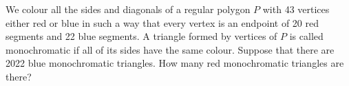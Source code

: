 \documentclass{article}
\begin{document}
\setlength{\parindent}{0pt}
We colour all the sides and diagonals of a regular polygon $P$ with 43 vertices either red or blue in such a way that every vertex is an endpoint of 20 red segments and 22 blue segments. A triangle formed by vertices of $P$ is called monochromatic if all of its sides
have the same colour. Suppose that there are 2022 blue monochromatic triangles. How many red monochromatic triangles are there?
\end{document}
